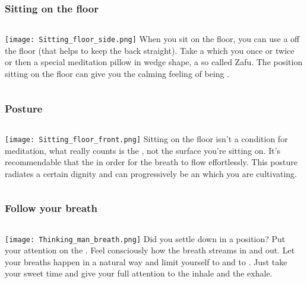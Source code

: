 \begin{frame}
\frametitle{Sitting on the floor}

\begin{columns}[c] %

\texttt{[image: Sitting\_floor\_side.png]}
When you sit on the floor, you can use a  off the floor (that helps to keep the back straight). Take a  which you  once or twice or then a special meditation pillow in wedge shape, a so called Zafu. The position sitting on the floor can give you the calming feeling of being . 
\end{columns}
\end{frame}

\begin{frame}
\frametitle{Posture}
\begin{columns}[c] %

\texttt{[image: Sitting\_floor\_front.png]}
Sitting on the floor isn't a condition for meditation, what really counts is the , not the surface you're sitting on. It's recommendable that the  in order for the breath to flow effortlessly. This posture radiates a certain dignity and can progressively be an  which you are cultivating. 
\end{columns}
\end{frame}


\begin{frame}
\frametitle{Follow your breath}
\begin{columns}[c] %

\texttt{[image: Thinking\_man\_breath.png]}
Did you settle down in a position? Put your attention on the . Feel consciously how the breath streams in and out. Let your breaths happen in a natural way and limit yourself to  and to . Just take your sweet time and give your full attention to the inhale and the exhale. 
\end{columns}
\end{frame}

